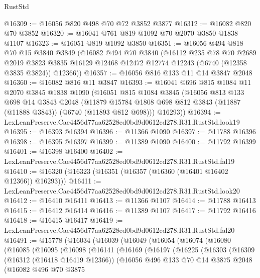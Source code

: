 \begin{lexlean}{RustStd}
\begin{coremodule}
@16309 := @16056 @820 @498 @70 @72 @3852 @3877
@16312 := @16082 @820 @70 @3852
@16320 := @16041 @761 @819 @1092 @70 @2070 @3850 @1838 @1107
@16323 := @16051 @819 @1092 @3850
@16351 := @16056
    @494
    @818
    @70
    @15
    @3840
    @3849
    (@16082
      @494
      @70
      @3840
      (@16112
        @235
        @78
        @70
        @2689
        @2019
        @3823
        @3835
        @16129
        @12468
        @12472
        @12774
        @12243
        (@6740 (@12358 @3835 @3824))
        @12366))
@16357 := @16056 @816 @133 @11 @14 @3847 @2048
@16360 := @16082 @816 @11 @3847
@16393 := @16041
    @696
    @815
    @1084
    @11
    @2070
    @3845
    @1838
    @1090
    (@16051
      @815
      @1084
      @3845
      (@16056
        @813
        @133
        @698
        @14
        @3843
        @2048
        (@11879 @15784 @1808 @698 @812 @3843 (@11887 (@11888 @3843)) (@6740 (@11893 @812 @698)))
        @16293))
@16394 := LexLeanPreserve.Cae4456d77aa62528ed0bd9d0612cd278.R31.RustStd.look19
@16395 := @16393 @16394
@16396 := @11366 @1090
@16397 := @11788 @16396
@16398 := @16395 @16397
@16399 := @11389 @1090
@16400 := @11792 @16399
@16401 := @16398 @16400
@16402 := LexLeanPreserve.Cae4456d77aa62528ed0bd9d0612cd278.R31.RustStd.fal19
@16410 := @16320 (@16323 (@16351 (@16357 (@16360 (@16401 @16402 @12366)) @16293)))
@16411 := LexLeanPreserve.Cae4456d77aa62528ed0bd9d0612cd278.R31.RustStd.look20
@16412 := @16410 @16411
@16413 := @11366 @1107
@16414 := @11788 @16413
@16415 := @16412 @16414
@16416 := @11389 @1107
@16417 := @11792 @16416
@16418 := @16415 @16417
@16419 := LexLeanPreserve.Cae4456d77aa62528ed0bd9d0612cd278.R31.RustStd.fal20
@16491 := @15778
    (@16034
      (@16039
        (@16049
          (@16054
            (@16074
              (@16080
                (@16085
                  (@16095
                    (@16098
                      (@16141
                        (@16169
                          (@16197
                            (@16225
                              (@16303
                                (@16309
                                  (@16312 (@16418 @16419 @12366))
                                  (@16056
                                    @496
                                    @133
                                    @70
                                    @14
                                    @3875
                                    @2048
                                    (@16082
                                      @496
                                      @70
                                      @3875

\end{coremodule}
\end{lexlean}
